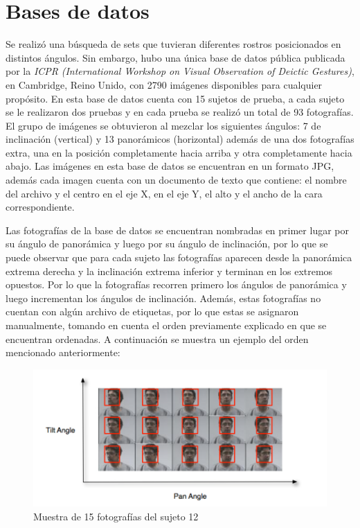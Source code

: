 \section{Bases de datos}
Se realizó una búsqueda de sets que tuvieran diferentes rostros posicionados en distintos ángulos. Sin embargo, hubo una única base de datos pública publicada por la \textit{ICPR} \textit{(International Workshop on Visual Observation of Deictic Gestures)}, en Cambridge, Reino Unido, con  2790 imágenes disponibles para cualquier propósito. En esta base de datos cuenta con 15 sujetos de prueba, a cada sujeto se le realizaron dos pruebas y en cada prueba se realizó un total de 93 fotografías. El grupo de imágenes se obtuvieron al mezclar los siguientes ángulos: 7 de inclinación (vertical) y 13 panorámicos (horizontal) además de una dos fotografías extra, una en la posición completamente hacia arriba y otra completamente hacia abajo. Las imágenes en esta base de datos se encuentran en un formato JPG, además cada imagen cuenta con un documento de texto que contiene: el nombre del archivo y el centro en el eje X, en el eje Y, el alto y el ancho de la cara correspondiente. \cite{Gourier_Hall_Crowley}

Las fotografías de la base de datos se encuentran nombradas en primer lugar por su ángulo de panorámica y luego por su ángulo de inclinación, por lo que se puede observar que para cada sujeto las fotografías aparecen desde la panorámica extrema derecha y la inclinación extrema inferior y terminan en los extremos opuestos. Por lo que la fotografías recorren primero los ángulos de panorámica y luego incrementan los ángulos de inclinación. Además, estas fotografías no cuentan con algún archivo de etiquetas, por lo que estas se asignaron manualmente, tomando en cuenta el orden previamente explicado en que se encuentran ordenadas. A continuación se muestra un ejemplo del orden mencionado anteriormente:

\begin{figure}[H]
	\centering
	\includegraphics[scale=1]{figures/tiltpan.png}
	\caption{Muestra de 15 fotografías del sujeto 12 \cite{Gourier_Hall_Crowley}}
	\label{fig:img0}
\end{figure}

